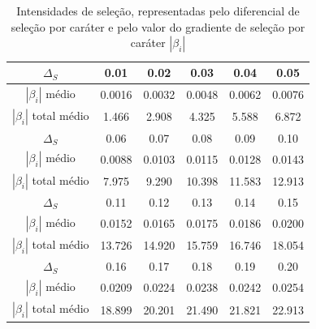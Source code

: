 \begin{table}[htbp]
    \centering
    \caption{Intensidades de seleção, representadas pelo diferencial de
        seleção por caráter e pelo valor do gradiente de seleção por caráter
    $|\beta_i|$}
    \label{tab:betasMFM}
    \vspace{1em}
    \begin{tabular}{c|c|c|c|c|c}
        \toprule
        $\Delta_S$ & 0.01 & 0.02 & 0.03 & 0.04 & 0.05 \\
        \hline
        $|\beta_i|$ médio & 0.0016 & 0.0032 & 0.0048 & 0.0062 & 0.0076 \\
         $|\beta_i|$ total médio & 1.466 & 2.908 & 4.325 & 5.588 & 6.872 \\
        \midrule
        \midrule
        $\Delta_S$ & 0.06 & 0.07 & 0.08 & 0.09 & 0.10 \\
        \hline
        $|\beta_i|$ médio & 0.0088 & 0.0103 & 0.0115 & 0.0128 & 0.0143 \\        
         $|\beta_i|$ total médio & 7.975 & 9.290 & 10.398 & 11.583 & 12.913 \\
        \midrule
        \midrule
        $\Delta_S$ & 0.11  & 0.12  & 0.13  & 0.14  & 0.15 \\ 
        \hline
        $|\beta_i|$ médio & 0.0152 & 0.0165 & 0.0175 & 0.0186 & 0.0200 \\    
         $|\beta_i|$ total médio & 13.726 & 14.920 & 15.759 & 16.746 & 18.054 \\
        \midrule
        \midrule
        $\Delta_S$ & 0.16  & 0.17  & 0.18  & 0.19  & 0.20  \\ 
        \hline
        $|\beta_i|$ médio & 0.0209 & 0.0224 & 0.0238 & 0.0242 & 0.0254 \\
         $|\beta_i|$ total médio & 18.899 &  20.201 & 21.490 & 21.821 & 22.913  \\
        \bottomrule
    \end{tabular}
\end{table}

